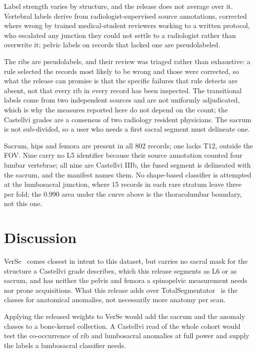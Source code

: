 \documentclass[aapm,mph,amsmath,amssymb,reprint]{revtex4-2}
\begin{document}
Label strength varies by structure, and the release does not average over it. Vertebral
labels derive from radiologist-supervised source annotations, corrected where wrong by trained
medical-student reviewers working to a written protocol, who escalated any junction they could
not settle to a radiologist rather than overwrite it; pelvic labels on records that lacked one
are pseudolabeled.

The ribs are pseudolabels, and their review was triaged rather than exhaustive: a rule
selected the records most likely to be wrong and those were corrected, so what the release
can promise is that the specific failures that rule detects are absent, not that every rib
in every record has been inspected. The transitional labels come from two independent
sources and are not uniformly adjudicated, which is why the measures reported here do not
depend on the count; the Castellvi grades are a consensus of two radiology resident
physicians. The sacrum is not sub-divided, so a user who needs a first sacral segment must
delineate one.

Sacrum, hips and femora are present in all 802 records; one lacks T12, outside the FOV. Nine
carry no L5 identifier because their source annotation counted four lumbar vertebrae; all nine
are Castellvi IIIb, the fused segment is delineated with the sacrum, and the manifest names
them. No shape-based classifier is attempted at the lumbosacral junction, where 15 records in
each rare stratum leave three per fold; the 0.990 area under the curve above is the
thoracolumbar boundary, not this one.

\section{Discussion}

VerSe~\cite{verse2021,versedata2021} comes closest in intent to this dataset, but carries no
sacral mask for the structure a Castellvi grade describes, which this release segments as L6
or as sacrum, and has neither the pelvis and femora a spinopelvic measurement needs nor prone
acquisitions. What this release adds
over TotalSegmentator~\cite{totalsegmentator,neurips2026lstv} is the classes for anatomical anomalies, not necessarily more
anatomy per scan.

Applying the released weights to VerSe would add the sacrum and the
anomaly classes to a bone-kernel collection. A Castellvi read of the whole cohort
would test the co-occurrence of rib and lumbosacral anomalies at full power and supply the
labels a lumbosacral classifier needs.
\end{document}
